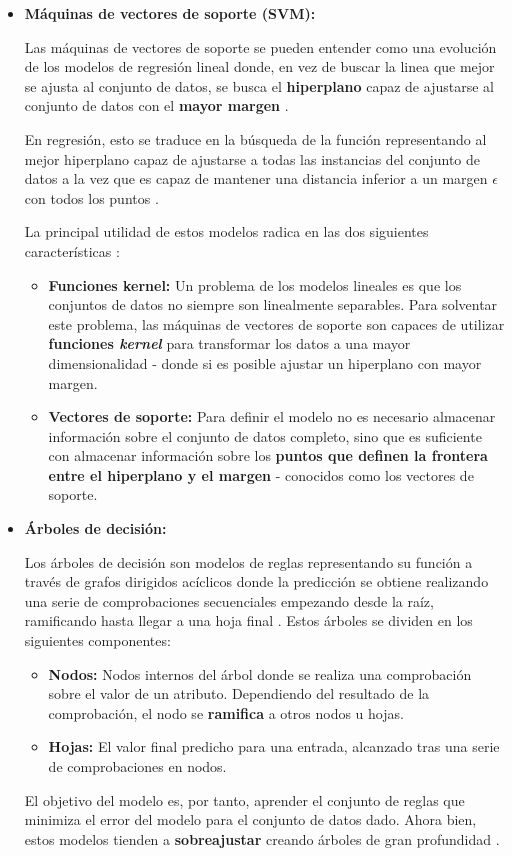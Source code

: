 \begin{itemize}[leftmargin=*]
	\item \textbf{Máquinas de vectores de soporte (SVM):} 
	
	Las máquinas de vectores de soporte se pueden entender como una evolución de los modelos de regresión lineal donde, en vez de buscar la linea que mejor se ajusta al conjunto de datos, se busca el \textbf{hiperplano} capaz de ajustarse al conjunto de datos con el \textbf{mayor margen} \cite{aima}. 
	
	En regresión, esto se traduce en la búsqueda de la función representando al mejor hiperplano capaz de ajustarse a todas las instancias del conjunto de datos a la vez que es capaz de mantener una distancia inferior a un margen $\epsilon$ con todos los puntos \cite{svr}.
	
	La principal utilidad de estos modelos radica en las dos siguientes características \cite{aima}:
	\begin{itemize}
		\item \textbf{Funciones kernel:} Un problema de los modelos lineales es que los conjuntos de datos no siempre son linealmente separables. Para solventar este problema, las máquinas de vectores de soporte son capaces de utilizar \textbf{funciones \textit{kernel}} para transformar los datos a una mayor dimensionalidad - donde si es posible ajustar un hiperplano con mayor margen.
		\item \textbf{Vectores de soporte:} Para definir el modelo no es necesario almacenar información sobre el conjunto de datos completo, sino que es suficiente con almacenar información sobre los \textbf{puntos que definen la frontera entre el hiperplano y el margen} - conocidos como los vectores de soporte.
	\end{itemize}
	\newpage
	\item \textbf{Árboles de decisión:} 
	
	Los árboles de decisión son modelos de reglas representando su función a través de grafos dirigidos acíclicos \cite{Burkov2019TheHM} donde la predicción se obtiene realizando una serie de comprobaciones secuenciales empezando desde la raíz, ramificando hasta llegar a una hoja final \cite{aima}. Estos árboles se dividen en los siguientes componentes:
	
	\begin{itemize}
		\item \textbf{Nodos:} Nodos internos del árbol donde se realiza una comprobación sobre el valor de un atributo. Dependiendo del resultado de la comprobación, el nodo se \textbf{ramifica} a otros nodos u hojas.
		\item \textbf{Hojas:} El valor final predicho para una entrada, alcanzado tras una serie de comprobaciones en nodos.
	\end{itemize}
	
	El objetivo del modelo es, por tanto, aprender el conjunto de reglas que minimiza el error del modelo para el conjunto de datos dado. Ahora bien, estos modelos tienden a \textbf{sobreajustar} creando árboles de gran profundidad \cite{aima}.

\end{itemize}

